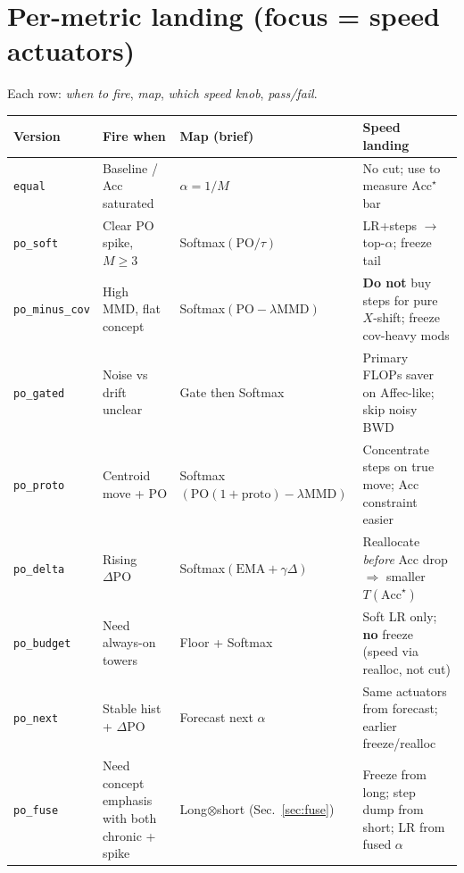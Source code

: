 \documentclass[11pt]{article}
\newcommand{\PO}{\mathrm{PO}}
\newcommand{\MMD}{\mathrm{MMD}}
\newcommand{\Acc}{\mathrm{Acc}}
\begin{document}
\section{Per-metric landing (focus = speed actuators)}
\label{sec:per}

Each row: \emph{when to fire}, \emph{map}, \emph{which speed knob},
\emph{pass/fail}.

\begin{center}
\small
\begin{tabular}{@{}p{1.55cm}p{2.4cm}p{2.6cm}p{2.8cm}@{}}
\toprule
Version & Fire when & Map (brief) & Speed landing \\
\midrule
\texttt{equal}
  & Baseline / Acc saturated
  & $\alpha=1/M$
  & No cut; use to measure $\Acc^\star$ bar \\
\texttt{po\_soft}
  & Clear $\PO$ spike, $M\ge3$
  & Softmax$(\PO/\tau)$
  & LR+steps $\to$ top-$\alpha$; freeze tail \\
\texttt{po\_minus\_cov}
  & High MMD, flat concept
  & Softmax$(\PO-\lambda\MMD)$
  & \textbf{Do not} buy steps for pure $X$-shift;
    freeze cov-heavy mods \\
\texttt{po\_gated}
  & Noise vs drift unclear
  & Gate then Softmax
  & Primary FLOPs saver on Affec-like;
    skip noisy BWD \\
\texttt{po\_proto}
  & Centroid move + $\PO$
  & Softmax$(\PO(1+\mathrm{proto})-\lambda\MMD)$
  & Concentrate steps on true move;
    Acc constraint easier \\
\texttt{po\_delta}
  & Rising $\Delta\PO$
  & Softmax$(\mathrm{EMA}+\gamma\Delta)$
  & Reallocate \emph{before} Acc drop
    $\Rightarrow$ smaller $T(\Acc^\star)$ \\
\texttt{po\_budget}
  & Need always-on towers
  & Floor + Softmax
  & Soft LR only; \textbf{no} freeze
    (speed via realloc, not cut) \\
\texttt{po\_next}
  & Stable hist + $\Delta\PO$
  & Forecast next $\alpha$
  & Same actuators from forecast;
    earlier freeze/realloc \\
\texttt{po\_fuse}
  & Need concept emphasis
    with both chronic + spike
  & Long$\otimes$short
    (Sec.~\ref{sec:fuse})
  & Freeze from long; step dump from short;
    LR from fused $\alpha$ \\
\bottomrule
\end{tabular}
\label{tab:land}
\end{center}
\end{document}
